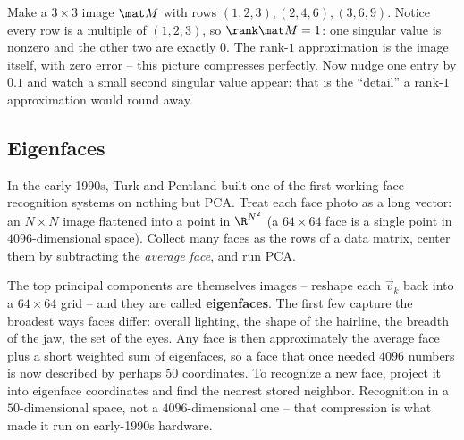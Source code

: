 \begin{labbox}
Make a $3\times3$ image $\mat M$ with rows $(1,2,3),(2,4,6),(3,6,9)$. Notice every
row is a multiple of $(1,2,3)$, so $\rank\mat M=1$: one singular value is nonzero
and the other two are exactly $0$. The rank-$1$ approximation is the image itself,
with zero error -- this picture compresses perfectly. Now nudge one entry by
$0.1$ and watch a small second singular value appear: that is the ``detail'' a
rank-$1$ approximation would round away.
\end{labbox}

\subsection{Eigenfaces}

In the early 1990s, Turk and Pentland built one of the first working face-recognition
systems on nothing but PCA. Treat each face photo as a long vector: an
$N\times N$ image flattened into a point in $\R^{N^2}$ (a $64\times64$ face is a
single point in $4096$-dimensional space). Collect many faces as the rows of a data
matrix, center them by subtracting the \emph{average face}, and run PCA.

The top principal components are themselves images -- reshape each $\vec v_k$ back
into a $64\times64$ grid -- and they are called \textbf{eigenfaces}. The first few
capture the broadest ways faces differ: overall lighting, the shape of the
hairline, the breadth of the jaw, the set of the eyes. Any face is then
approximately the average face plus a short weighted sum of eigenfaces, so a face
that once needed $4096$ numbers is now described by perhaps $50$ coordinates. To
recognize a new face, project it into eigenface coordinates and find the nearest
stored neighbor. Recognition in a $50$-dimensional space, not a $4096$-dimensional
one -- that compression is what made it run on early-1990s hardware.


